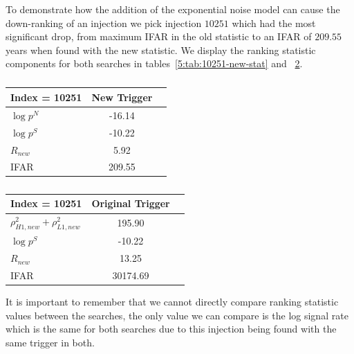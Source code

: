 To demonstrate how the addition of the exponential noise model can cause the down-ranking of an injection we pick injection $10251$ which had the most significant drop, from maximum IFAR in the old statistic to an IFAR of $209.55$ years when found with the new statistic. We display the ranking statistic components for both searches in tables~\ref{5:tab:10251-new-stat} and ~\ref{5:tab:10251-old-stat}.
%
\begin{table}[ht]
    \centering
    \setlength{\tabcolsep}{4pt}
    \begin{minipage}{0.48\textwidth}
        \centering
        \begin{adjustbox}{minipage=\linewidth-0cm, margin=0.5cm 0cm 0cm 0cm}
        \begin{tabular}{lcc}
            \toprule
            \textbf{Index = 10251} & \textbf{New Trigger} \\
            \midrule
            $\log p^{N}$  & -16.14 \\
            $\log p^{S}$ & -10.22 \\
            $R_{new}$ & 5.92 \\
            IFAR & 209.55 \\
            \bottomrule
        \end{tabular}
        \end{adjustbox}
        \caption{}
        \label{5:tab:10251-new-stat}
    \end{minipage}
    \hfill
    \begin{minipage}{0.48\textwidth}
        \centering
        \begin{tabular}{lcc}
            \toprule
            \textbf{Index = 10251} & \textbf{Original Trigger}\\
            \midrule
            $\rho_{H1,new}^2 + \rho_{L1,new}^2$   & 195.90 \\
            $\log p^{S}$ & -10.22 \\
            $R_{new}$ & 13.25 \\
            IFAR & 30174.69 \\
            \bottomrule
        \end{tabular}
        \caption{}
        \label{5:tab:10251-old-stat}
    \end{minipage}
\end{table}
%
It is important to remember that we cannot directly compare ranking statistic values between the searches, the only value we can compare is the log signal rate which is the same for both searches due to this injection being found with the same trigger in both.

